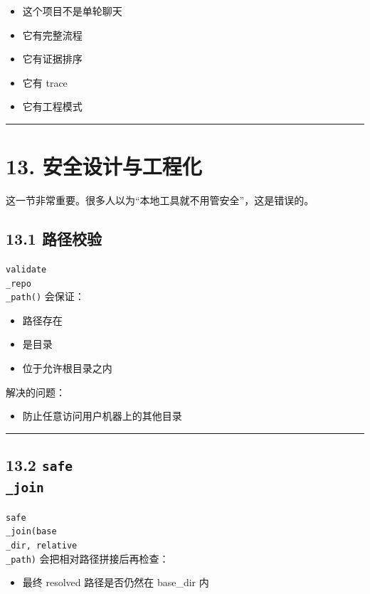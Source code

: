 \documentclass[UTF8,12pt,openany]{ctexbook}
\begin{document}
\begin{itemize}
\item 这个项目不是单轮聊天
\item 它有完整流程
\item 它有证据排序
\item 它有 trace
\item 它有工程模式
\end{itemize}

\hrule

\section{13. 安全设计与工程化}

这一节非常重要。很多人以为“本地工具就不用管安全”，这是错误的。\par

\subsection{13.1 路径校验}

\texttt{validate\\_repo\\_path()} 会保证：\par

\begin{itemize}
\item 路径存在
\item 是目录
\item 位于允许根目录之内
\end{itemize}

解决的问题：\par

\begin{itemize}
\item 防止任意访问用户机器上的其他目录
\end{itemize}

\hrule

\subsection{13.2 \texttt{safe\\_join}}

\texttt{safe\\_join(base\\_dir, relative\\_path)} 会把相对路径拼接后再检查：\par

\begin{itemize}
\item 最终 resolved 路径是否仍然在 base\_dir 内
\end{itemize}
\end{document}
